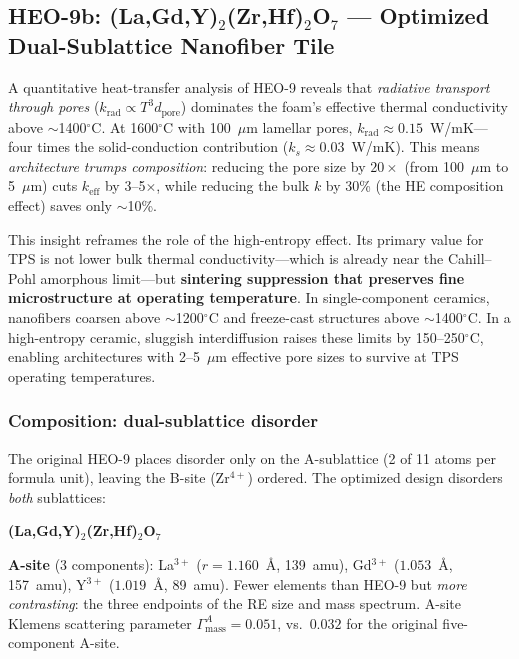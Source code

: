 \documentclass[12pt,letterpaper]{article}
\theoremstyle{definition}
\begin{document}
\subsection[HEO-9b: Optimized Dual-Sublattice Nanofiber Tile]{HEO-9b: (La,Gd,Y)$_2$(Zr,Hf)$_2$O$_7$ --- Optimized\\Dual-Sublattice Nanofiber Tile}\label{sec:heo9b}

A quantitative heat-transfer analysis of HEO-9 reveals that \emph{radiative transport through pores} ($k_{\mathrm{rad}} \propto T^3 d_{\mathrm{pore}}$) dominates the foam's effective thermal conductivity above $\sim$1400$^\circ$C.  At 1600$^\circ$C with 100~$\mu$m lamellar pores, $k_{\mathrm{rad}} \approx 0.15$~W/mK---four times the solid-conduction contribution ($k_s \approx 0.03$~W/mK).  This means \emph{architecture trumps composition}: reducing the pore size by $20\times$ (from 100~$\mu$m to 5~$\mu$m) cuts $k_{\mathrm{eff}}$ by 3--5$\times$, while reducing the bulk $k$ by 30\% (the HE composition effect) saves only $\sim$10\%.

This insight reframes the role of the high-entropy effect.  Its primary value for TPS is not lower bulk thermal conductivity---which is already near the Cahill--Pohl amorphous limit---but \textbf{sintering suppression that preserves fine microstructure at operating temperature}.  In single-component ceramics, nanofibers coarsen above $\sim$1200$^\circ$C and freeze-cast structures above $\sim$1400$^\circ$C.  In a high-entropy ceramic, sluggish interdiffusion raises these limits by 150--250$^\circ$C, enabling architectures with 2--5~$\mu$m effective pore sizes to survive at TPS operating temperatures.

\subsubsection{Composition: dual-sublattice disorder}

The original HEO-9 places disorder only on the A-sublattice (2 of 11 atoms per formula unit), leaving the B-site (Zr$^{4+}$) ordered.  The optimized design disorders \emph{both} sublattices:

\begin{center}
\textbf{(La,Gd,Y)$_2$(Zr,Hf)$_2$O$_7$}
\end{center}

\textbf{A-site} (3 components): La$^{3+}$ ($r = 1.160$~\AA, 139~amu), Gd$^{3+}$ ($1.053$~\AA, 157~amu), Y$^{3+}$ ($1.019$~\AA, 89~amu).  Fewer elements than HEO-9 but \emph{more contrasting}: the three endpoints of the RE size and mass spectrum.  A-site Klemens scattering parameter $\Gamma_{\mathrm{mass}}^A = 0.051$, vs.\ $0.032$ for the original five-component A-site.
\end{document}
